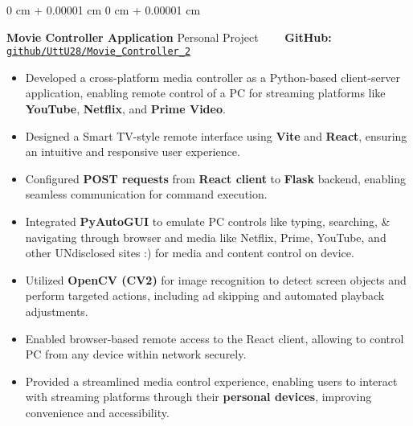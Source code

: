 \documentclass[10pt, letterpaper]{article}
\newenvironment{highlights}{
    \begin{itemize}[
        topsep=0.10 cm,
        parsep=0.10 cm,
        partopsep=0pt,
        itemsep=0pt,
        leftmargin=0 cm + 10pt
    ]
}{
    \end{itemize}
} %
\newenvironment{onecolentry}{
    \begin{adjustwidth}{
        0 cm + 0.00001 cm
    }{
        0 cm + 0.00001 cm
    }
}{
    \end{adjustwidth}
} %
\begin{document}
\begin{onecolentry}
	\textbf{Movie Controller Application} \hfill Personal Project \ \ \ \ \textbf{GitHub:} \href{https://github.com/UttU28/Movie_Controller_2}{\texttt{github/UttU28/Movie\_Controller\_2}}
	\begin{highlights}
		\item Developed a cross-platform media controller as a Python-based client-server application, enabling remote control of a PC for streaming platforms like \textbf{YouTube}, \textbf{Netflix}, and \textbf{Prime Video}.
		\item Designed a Smart TV-style remote interface using \textbf{Vite} and \textbf{React}, ensuring an intuitive and responsive user experience.
		\item Configured \textbf{POST requests} from \textbf{React client} to \textbf{Flask} backend, enabling seamless communication for command execution.
		\item Integrated \textbf{PyAutoGUI} to emulate PC controls like typing, searching, \& navigating through browser and media like Netflix, Prime, YouTube, and other UNdisclosed sites :) for media and content control on device.
		\item Utilized \textbf{OpenCV (CV2)} for image recognition to detect screen objects and perform targeted actions, including ad skipping and automated playback adjustments.
		\item Enabled browser-based remote access to the React client, allowing to control PC from any device within network securely.
		\item Provided a streamlined media control experience, enabling users to interact with streaming platforms through their \textbf{personal devices}, improving convenience and accessibility.
	\end{highlights}
\end{onecolentry}
\end{document}
